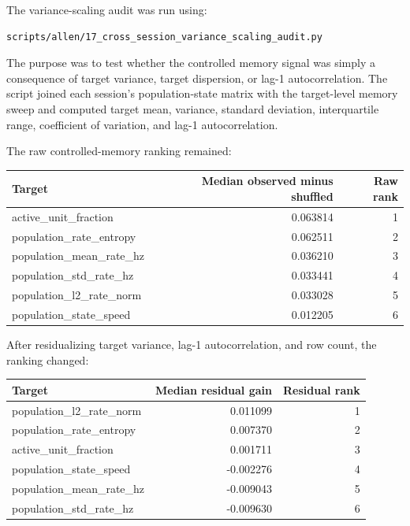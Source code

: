 The variance-scaling audit was run using:

\begin{verbatim}
scripts/allen/17_cross_session_variance_scaling_audit.py
\end{verbatim}

The purpose was to test whether the controlled memory signal was simply a consequence of target variance, target dispersion, or lag-1 autocorrelation. The script joined each session's population-state matrix with the target-level memory sweep and computed target mean, variance, standard deviation, interquartile range, coefficient of variation, and lag-1 autocorrelation.

The raw controlled-memory ranking remained:

\begin{center}
\begin{tabular}{lrr}
\hline
Target & Median observed minus shuffled & Raw rank \\
\hline
active\_unit\_fraction & 0.063814 & 1 \\
population\_rate\_entropy & 0.062511 & 2 \\
population\_mean\_rate\_hz & 0.036210 & 3 \\
population\_std\_rate\_hz & 0.033441 & 4 \\
population\_l2\_rate\_norm & 0.033028 & 5 \\
population\_state\_speed & 0.012205 & 6 \\
\hline
\end{tabular}
\end{center}

After residualizing target variance, lag-1 autocorrelation, and row count, the ranking changed:

\begin{center}
\begin{tabular}{lrr}
\hline
Target & Median residual gain & Residual rank \\
\hline
population\_l2\_rate\_norm & 0.011099 & 1 \\
population\_rate\_entropy & 0.007370 & 2 \\
active\_unit\_fraction & 0.001711 & 3 \\
population\_state\_speed & -0.002276 & 4 \\
population\_mean\_rate\_hz & -0.009043 & 5 \\
population\_std\_rate\_hz & -0.009630 & 6 \\
\hline
\end{tabular}
\end{center}

